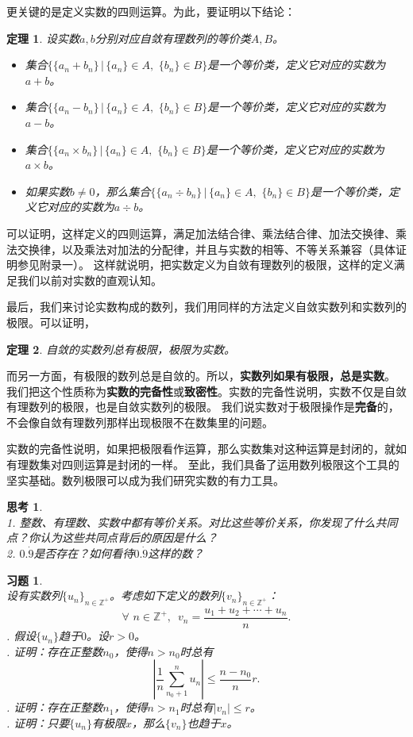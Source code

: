 \documentclass[12pt,UTF8]{ctexbook}
\newtheorem{tm}{定理}[section]
\newtheorem{sk}{思考}[section]
\newtheorem{xt}{习题}[section]
\begin{document}
更关键的是定义实数的四则运算。为此，要证明以下结论：
\begin{tm}
    设实数$a,b$分别对应自敛有理数列的等价类$A,B$。
    \begin{itemize}
        \item 集合$\{\{a_n + b_n\} \, | \, \{a_n\}\in A,\,\, \{b_n\}\in B\}$是一个等价类，定义它对应的实数为$a + b$。
        \item 集合$\{\{a_n - b_n\} \, | \, \{a_n\}\in A,\,\, \{b_n\}\in B\}$是一个等价类，定义它对应的实数为$a - b$。
        \item 集合$\{\{a_n \times b_n\} \, | \, \{a_n\}\in A,\,\, \{b_n\}\in B\}$是一个等价类，定义它对应的实数为$a \times b$。
        \item 如果实数$b\neq 0$，那么集合$\{\{a_n \div b_n\} \, | \, \{a_n\}\in A,\,\, \{b_n\}\in B\}$是一个等价类，定义它对应的实数为$a \div b$。
    \end{itemize}  
\end{tm}
可以证明，这样定义的四则运算，满足加法结合律、乘法结合律、加法交换律、乘法交换律，以及乘法对加法的分配律，并且与实数的相等、不等关系兼容（具体证明参见附录一）。
这样就说明，把实数定义为自敛有理数列的极限，这样的定义满足我们以前对实数的直观认知。

最后，我们来讨论实数构成的数列，我们用同样的方法定义自敛实数列和实数列的极限。可以证明，
\begin{tm}
    自敛的实数列总有极限，极限为实数。
\end{tm}
而另一方面，有极限的数列总是自敛的。所以，\textbf{实数列如果有极限，总是实数}。
我们把这个性质称为\textbf{实数的完备性}或\textbf{致密性}。实数的完备性说明，实数不仅是自敛有理数列的极限，也是自敛实数列的极限。
我们说实数对于极限操作是\textbf{完备}的，不会像自敛有理数列那样出现极限不在数集里的问题。

实数的完备性说明，如果把极限看作运算，那么实数集对这种运算是封闭的，就如有理数集对四则运算是封闭的一样。
至此，我们具备了运用数列极限这个工具的坚实基础。数列极限可以成为我们研究实数的有力工具。

\begin{sk}
    \mbox{}\\
    1. 整数、有理数、实数中都有等价关系。对比这些等价关系，你发现了什么共同点？你认为这些共同点背后的原因是什么？\\
    2. $0.\dot{9}$是否存在？如何看待$0.\dot{9}$这样的数？
\end{sk}

\begin{xt}
    \mbox{} \\
    设有实数列$\{u_n\}_{n\in\mathbb{Z}^+}$。考虑如下定义的数列$\{v_n\}_{n\in\mathbb{Z}^+}$：
    $$ \forall \,\, n\in\mathbb{Z}^+, \,\,\, v_n = \frac{u_1 + u_2 + \cdots + u_n}{n}. $$
    . 假设$\{u_n\}$趋于$0$。设$r>0$。\\
    . 证明：存在正整数$n_0$，使得$n>n_0$时总有
    $$ \left| \frac{1}{n} \sum_{n_0+1}^n u_n \right| \leqslant \frac{n-n_0}{n}r.$$
    . 证明：存在正整数$n_1$，使得$n>n_1$时总有$|v_n| \leqslant r$。\\
    . 证明：只要$\{u_n\}$有极限$x$，那么$\{v_n\}$也趋于$x$。
\end{xt}
\end{document}
